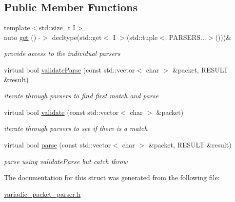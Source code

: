\subsection*{Public Member Functions}
\begin{DoxyCompactItemize}
\item 
\hypertarget{structquanergy_1_1client_1_1VariadicPacketParser_a76139502de94d8f94bc9d5b9ac749695}{{\footnotesize template$<$std\-::size\-\_\-t I$>$ }\\auto \hyperlink{structquanergy_1_1client_1_1VariadicPacketParser_a76139502de94d8f94bc9d5b9ac749695}{get} () -\/$>$ decltype(std\-::get$<$ I $>$(std\-::tuple$<$ P\-A\-R\-S\-E\-R\-S...$>$()))\&}\label{structquanergy_1_1client_1_1VariadicPacketParser_a76139502de94d8f94bc9d5b9ac749695}

\begin{DoxyCompactList}\small\item\em provide access to the individual parsers \end{DoxyCompactList}\item 
\hypertarget{structquanergy_1_1client_1_1VariadicPacketParser_a58a6ec899ab3ee7f2fbd92b4d45082eb}{virtual bool \hyperlink{structquanergy_1_1client_1_1VariadicPacketParser_a58a6ec899ab3ee7f2fbd92b4d45082eb}{validate\-Parse} (const std\-::vector$<$ char $>$ \&packet, R\-E\-S\-U\-L\-T \&result)}\label{structquanergy_1_1client_1_1VariadicPacketParser_a58a6ec899ab3ee7f2fbd92b4d45082eb}

\begin{DoxyCompactList}\small\item\em iterate through parsers to find first match and parse \end{DoxyCompactList}\item 
\hypertarget{structquanergy_1_1client_1_1VariadicPacketParser_a5b53284ba762fc0d9355d28f552bd674}{virtual bool \hyperlink{structquanergy_1_1client_1_1VariadicPacketParser_a5b53284ba762fc0d9355d28f552bd674}{validate} (const std\-::vector$<$ char $>$ \&packet)}\label{structquanergy_1_1client_1_1VariadicPacketParser_a5b53284ba762fc0d9355d28f552bd674}

\begin{DoxyCompactList}\small\item\em iterate through parsers to see if there is a match \end{DoxyCompactList}\item 
\hypertarget{structquanergy_1_1client_1_1VariadicPacketParser_af66c0c1212314c43f6a183e7a4711e44}{virtual bool \hyperlink{structquanergy_1_1client_1_1VariadicPacketParser_af66c0c1212314c43f6a183e7a4711e44}{parse} (const std\-::vector$<$ char $>$ \&packet, R\-E\-S\-U\-L\-T \&result)}\label{structquanergy_1_1client_1_1VariadicPacketParser_af66c0c1212314c43f6a183e7a4711e44}

\begin{DoxyCompactList}\small\item\em parse using validate\-Parse but catch throw \end{DoxyCompactList}\end{DoxyCompactItemize}


The documentation for this struct was generated from the following file\-:\begin{DoxyCompactItemize}
\item 
\hyperlink{variadic__packet__parser_8h}{variadic\-\_\-packet\-\_\-parser.\-h}\end{DoxyCompactItemize}
